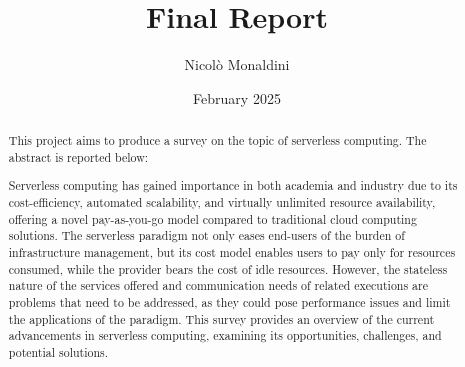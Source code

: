 \documentclass{scrartcl}
\title{\LARGE
    Final Report
}
\author{
    Nicolò Monaldini \\ \emailaddr{nicolo.monaldini@studio.unibo.it}
}
\date{February 2025}
\begin{document}
\maketitle

\begin{abstract}
    This project aims to produce a survey on the topic of serverless computing. The abstract is reported below: 
    
    Serverless computing has gained importance in both academia and industry due to its cost-efficiency, automated scalability, and virtually unlimited resource availability, offering a novel pay-as-you-go model compared to traditional cloud computing solutions. The serverless paradigm not only eases end-users of the burden of infrastructure management, but its cost model enables users to pay only for resources consumed, while the provider bears the cost of idle resources. However, the stateless nature of the services offered and communication needs of related executions are problems that need to be addressed, as they could pose performance issues and limit the applications of the paradigm. This survey provides an overview of the current advancements in serverless computing, examining its opportunities, challenges, and potential solutions. 
\end{abstract}







\end{document}
